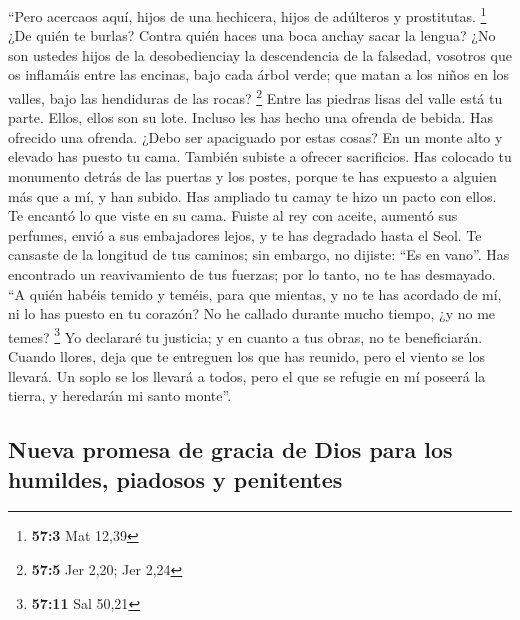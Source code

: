  ``Pero acercaos aquí, hijos de una hechicera, hijos de
adúlteros y prostitutas. \footnote{\textbf{57:3} Mat 12,39}
 ¿De quién te burlas? Contra quién haces una boca anchay
sacar la lengua? ¿No son ustedes hijos de la desobedienciay la
descendencia de la falsedad,  vosotros que os inflamáis
entre las encinas, bajo cada árbol verde; que matan a los niños en los
valles, bajo las hendiduras de las rocas? \footnote{\textbf{57:5} Jer
  2,20; Jer 2,24}  Entre las piedras lisas del valle está
tu parte. Ellos, ellos son su lote. Incluso les has hecho una ofrenda de
bebida. Has ofrecido una ofrenda. ¿Debo ser apaciguado por estas cosas?
 En un monte alto y elevado has puesto tu cama. También
subiste a ofrecer sacrificios.  Has colocado tu monumento
detrás de las puertas y los postes, porque te has expuesto a alguien más
que a mí, y han subido. Has ampliado tu camay te hizo un pacto con
ellos. Te encantó lo que viste en su cama.  Fuiste al rey
con aceite, aumentó sus perfumes, envió a sus embajadores lejos, y te
has degradado hasta el Seol.  Te cansaste de la longitud
de tus caminos; sin embargo, no dijiste: ``Es en vano''. Has encontrado
un reavivamiento de tus fuerzas; por lo tanto, no te has desmayado.
 ``A quién habéis temido y teméis, para que mientas, y no
te has acordado de mí, ni lo has puesto en tu corazón? No he callado
durante mucho tiempo, ¿y no me temes? \footnote{\textbf{57:11} Sal 50,21}
 Yo declararé tu justicia; y en cuanto a tus obras, no te
beneficiarán.  Cuando llores, deja que te entreguen los
que has reunido, pero el viento se los llevará. Un soplo se los llevará
a todos, pero el que se refugie en mí poseerá la tierra, y heredarán mi
santo monte''.

\hypertarget{nueva-promesa-de-gracia-de-dios-para-los-humildes-piadosos-y-penitentes}{%
\subsection{Nueva promesa de gracia de Dios para los humildes, piadosos
y
penitentes}\label{nueva-promesa-de-gracia-de-dios-para-los-humildes-piadosos-y-penitentes}}

